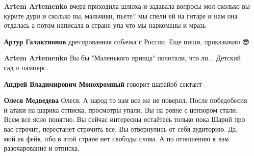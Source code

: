 \begin{itemize}
\begin{itemize}
 
\textbf{Artem Artemenko} вчера приходила шлюха
и задавала вопросы
мол сколько вы курите дури
и сколько вы, мальчики, пьете?
мы спели ей на гитаре
и нам она отдалась
а потом написала в стране упа
что мы наркоманы и мразь

 
\textbf{Артур Галактионов} дресированная собачка с России.
Еще пиши, приказываю 😎

 
\textbf{Artem Artemenko} Вы бы "Маленького принца" почитали, что ли... Детский сад и памперс.

 
\textbf{Андрей Владимирович Монохромный} говорит шарайоб сектант

 
\textbf{Олеся Медведева} Олеся. А народ то вам все же не поверил. После победобесия и атаки на шарика отписка, просмотры упали. Вы на ровне с цензором стали. Всем все ясно понятно. Вы сейчас интересны остаётесь только пока Шарий про вас строчит, перестанет строчить все. Вы отвернулись от себя аудиторию. Да, мой ак фейк, ибо в этой стране нет свободы слова. А по отношению к вам разочарование и отписка.


\end{itemize}
\end{itemize}
